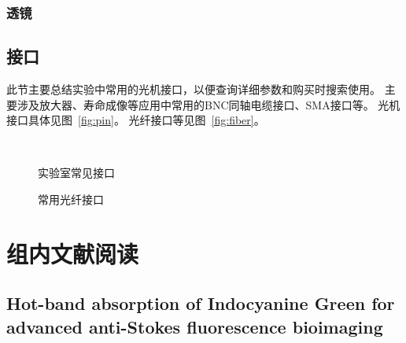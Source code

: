 \documentclass[cn,11pt,chinese]{elegantbook}
\begin{document}
\subsection{透镜}

\section{接口}
此节主要总结实验中常用的光机接口，以便查询详细参数和购买时搜索使用。
主要涉及放大器、寿命成像等应用中常用的BNC同轴电缆接口、SMA接口等。
光机接口具体见图~\vref{fig:pin}。
光纤接口等见图~\vref{fig:fiber}。
\begin{figure}[ht]
	\centering
	 \quad
	 \quad
	 \quad
	 \\
	\caption{实验室常见接口} 
	\label{fig:pin}
\end{figure}

\begin{figure}[ht]
	\centering
	 \quad
	  \quad
	\caption{常用光纤接口} 
	\label{fig:fiber}
\end{figure}

\chapter{组内文献阅读}
\section{Hot-band absorption of Indocyanine Green for advanced anti-Stokes fluorescence bioimaging}
\end{document}
